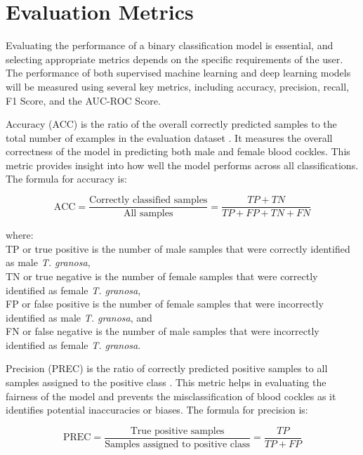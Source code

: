 \section{Evaluation Metrics}
Evaluating the performance of a binary classification model is essential, and selecting appropriate metrics depends on the specific requirements of the user. The performance of both supervised machine learning and deep learning models will be measured using several key metrics, including accuracy, precision, recall, F1 Score, and the AUC-ROC Score.

Accuracy (ACC) is the ratio of the overall correctly predicted samples to the total number of examples in the evaluation dataset \cite{cui2020}. It measures the overall correctness of the model in predicting both male and female blood cockles. This metric provides insight into how well the model performs across all classifications. The formula for accuracy is: 

\begin{equation}
	\text{ACC} = \frac{\text{Correctly classified samples}}{\text{All samples}} = \frac{TP + TN}{TP + FP + TN + FN}
	\label{eq:acc}
\end{equation}

\hspace*{2em}where: \\
\hspace*{2em}TP or true positive is the number of male samples that were correctly identified as male \textit{T. granosa}, \\
\hspace*{2em}TN or true negative is the number of female samples that were correctly identified as female \textit{T. granosa}, \\
\hspace*{2em}FP or false positive is the number of female samples that were incorrectly identified as male \textit{T. granosa}, and \\
\hspace*{2em}FN or false negative is the number of male samples that were incorrectly identified as female \textit{T. granosa}.


Precision (PREC) is the ratio of correctly predicted positive samples to all samples assigned to the positive class \cite{cui2020}. This metric helps in evaluating the fairness of the model and prevents the misclassification of blood cockles as it identifies potential inaccuracies or biases. The formula for precision is:

\begin{equation}
	\text{PREC} = \frac{\text{True positive samples}}{\text{Samples assigned to positive class}} = \frac{TP}{TP + FP}
	\label{eq:prec}
\end{equation}

